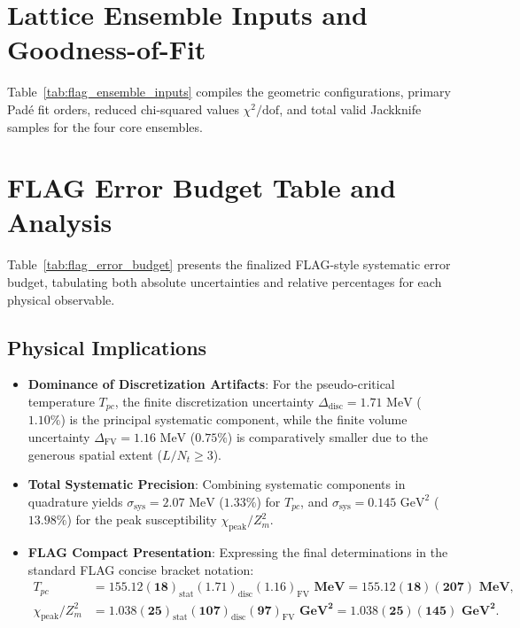 \documentclass[11pt,a4paper]{article}
\begin{document}
\section{Lattice Ensemble Inputs and Goodness-of-Fit}

Table~\ref{tab:flag_ensemble_inputs} compiles the geometric configurations, primary Padé fit orders, reduced chi-squared values $\chi^2/\mathrm{dof}$, and total valid Jackknife samples for the four core ensembles.



\section{FLAG Error Budget Table and Analysis}

Table~\ref{tab:flag_error_budget} presents the finalized FLAG-style systematic error budget, tabulating both absolute uncertainties and relative percentages for each physical observable.

\subsection{Physical Implications}
\begin{itemize}
    \item \textbf{Dominance of Discretization Artifacts}:
    For the pseudo-critical temperature $T_{pc}$, the finite discretization uncertainty $\Delta_{\mathrm{disc}} = 1.71\text{ MeV}$ ($1.10\%$) is the principal systematic component, while the finite volume uncertainty $\Delta_{\mathrm{FV}} = 1.16\text{ MeV}$ ($0.75\%$) is comparatively smaller due to the generous spatial extent ($L/N_t \ge 3$).
    \item \textbf{Total Systematic Precision}:
    Combining systematic components in quadrature yields $\sigma_{\mathrm{sys}} = 2.07\text{ MeV}$ ($1.33\%$) for $T_{pc}$, and $\sigma_{\mathrm{sys}} = 0.145\text{ GeV}^2$ ($13.98\%$) for the peak susceptibility $\chi_{\mathrm{peak}}/Z_m^2$.
    \item \textbf{FLAG Compact Presentation}:
    Expressing the final determinations in the standard FLAG concise bracket notation:
    \begin{align}
        T_{pc} &= \mathbf{155.12(18)_{\mathrm{stat}}(1.71)_{\mathrm{disc}}(1.16)_{\mathrm{FV}}\text{ MeV}} = \mathbf{155.12(18)(207)\text{ MeV}}, \\
        \chi_{\mathrm{peak}}/Z_m^2 &= \mathbf{1.038(25)_{\mathrm{stat}}(107)_{\mathrm{disc}}(97)_{\mathrm{FV}}\text{ GeV}^2} = \mathbf{1.038(25)(145)\text{ GeV}^2}.
    \end{align}
\end{itemize}
\end{document}
